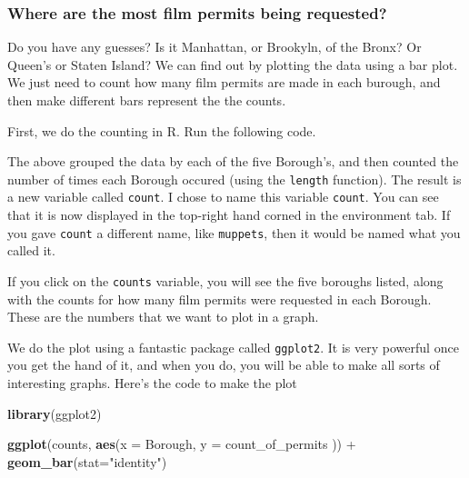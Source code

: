 \documentclass[]{book}
\newenvironment{Shaded}{\begin{snugshade}}{\end{snugshade}}
\newcommand{\KeywordTok}[1]{\textcolor[rgb]{0.13,0.29,0.53}{\textbf{{#1}}}}
\newcommand{\DataTypeTok}[1]{\textcolor[rgb]{0.13,0.29,0.53}{{#1}}}
\newcommand{\StringTok}[1]{\textcolor[rgb]{0.31,0.60,0.02}{{#1}}}
\newcommand{\NormalTok}[1]{{#1}}
\theoremstyle{definition}
\theoremstyle{definition}
\theoremstyle{definition}
\theoremstyle{remark}
\begin{document}
\subsubsection{Where are the most film permits being
requested?}\label{where-are-the-most-film-permits-being-requested}

Do you have any guesses? Is it Manhattan, or Brookyln, of the Bronx? Or
Queen's or Staten Island? We can find out by plotting the data using a
bar plot. We just need to count how many film permits are made in each
burough, and then make different bars represent the the counts.

First, we do the counting in R. Run the following code.

\begin{Shaded}
\end{Shaded}

The above grouped the data by each of the five Borough's, and then
counted the number of times each Borough occured (using the
\texttt{length} function). The result is a new variable called
\texttt{count}. I chose to name this variable \texttt{count}. You can
see that it is now displayed in the top-right hand corned in the
environment tab. If you gave \texttt{count} a different name, like
\texttt{muppets}, then it would be named what you called it.

If you click on the \texttt{counts} variable, you will see the five
boroughs listed, along with the counts for how many film permits were
requested in each Borough. These are the numbers that we want to plot in
a graph.

We do the plot using a fantastic package called \texttt{ggplot2}. It is
very powerful once you get the hand of it, and when you do, you will be
able to make all sorts of interesting graphs. Here's the code to make
the plot

\begin{Shaded}
\begin{Highlighting}[]
\KeywordTok{library}\NormalTok{(ggplot2)}

\KeywordTok{ggplot}\NormalTok{(counts, }\KeywordTok{aes}\NormalTok{(}\DataTypeTok{x =} \NormalTok{Borough, }\DataTypeTok{y =} \NormalTok{count_of_permits )) +}
\StringTok{  }\KeywordTok{geom_bar}\NormalTok{(}\DataTypeTok{stat=}\StringTok{"identity"}\NormalTok{)}
\end{Highlighting}
\end{Shaded}
\end{document}
